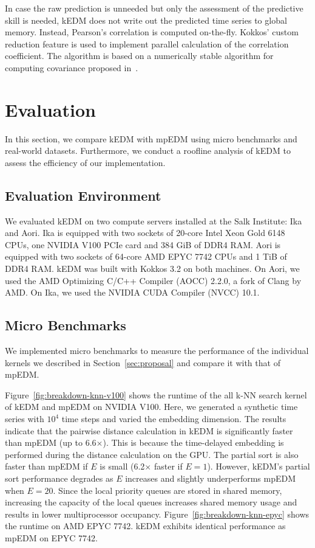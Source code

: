 \documentclass[sigconf]{acmart}
\begin{document}
In case the raw prediction is unneeded but only the assessment of the
predictive skill is needed, kEDM does not write out the predicted time series
to global memory. Instead, Pearson’s correlation is computed on-the-fly.
Kokkos’ custom reduction feature is used to implement parallel calculation of the
correlation coefficient. The algorithm is based on a numerically stable
algorithm for computing covariance proposed in~\cite{Schubert2018}.

\section{Evaluation}\label{sec:evaluation}

In this section, we compare kEDM with mpEDM using micro benchmarks and
real-world datasets. Furthermore, we conduct a roofline analysis of kEDM to
assess the efficiency of our implementation.

\subsection{Evaluation Environment}


We evaluated kEDM on two compute servers installed at the Salk Institute: Ika and Aori.
Ika is equipped with two sockets of 20-core Intel Xeon Gold
6148 CPUs, one NVIDIA V100 PCIe card and 384 GiB of DDR4 RAM\@. Aori is equipped with
two sockets of 64-core AMD EPYC 7742 CPUs and 1 TiB of DDR4 RAM\@. kEDM was built
with Kokkos 3.2 on both machines. On Aori, we used the AMD Optimizing C/C++
Compiler (AOCC) 2.2.0, a fork of Clang by AMD. On Ika, we used the NVIDIA CUDA
Compiler (NVCC) 10.1.

\subsection{Micro Benchmarks}

We implemented micro benchmarks to measure the performance of the individual
kernels we described in Section~\ref{sec:proposal} and compare it with that of
mpEDM\@.

Figure~\ref{fig:breakdown-knn-v100} shows the runtime of the all k-NN search kernel
of kEDM and mpEDM on NVIDIA V100. Here, we generated a synthetic time series with
$10^4$ time steps and varied the embedding dimension.
The results indicate that the pairwise
distance calculation in kEDM is significantly faster than mpEDM (up to
6.6$\times$). This is because the time-delayed embedding is performed during the distance
calculation on the GPU\@. The partial sort is also faster than mpEDM if $E$ is small
(6.2$\times$ faster if $E=1$). However, kEDM's partial sort performance degrades as
$E$ increases and  slightly underperforms mpEDM when $E=20$. Since the local
priority queues are stored in shared memory, increasing the capacity of the local
queues increases shared memory usage and results in lower multiprocessor occupancy.
Figure~\ref{fig:breakdown-knn-epyc} shows the runtime on AMD EPYC 7742. kEDM exhibits
identical performance as mpEDM on EPYC 7742.
\end{document}
